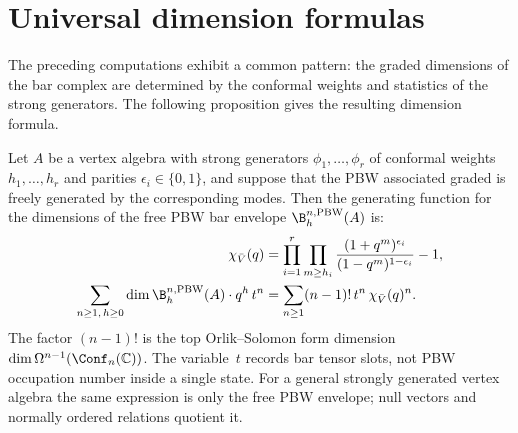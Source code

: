 \section{Universal dimension formulas}
\label{sec:universal-dim-formulas}

The preceding computations exhibit a common pattern: the graded
dimensions of the bar complex are determined by the
conformal weights and statistics of the strong generators.
The following proposition gives the resulting dimension formula.

\begin{proposition}
\label{prop:universal-dim-formula}
Let $A$ be a vertex algebra with strong generators
$\phi_1, \ldots, \phi_r$ of conformal weights $h_1, \ldots, h_r$
and parities $\epsilon_i \in \{0, 1\}$, and suppose that the PBW
associated graded is freely generated by the corresponding modes.
Then the generating function for the dimensions of the free PBW bar
envelope $\B^{n,\mathrm{PBW}}_h(A)$ is:
\begin{align}
\chi_{\bar V}(q)
&=
\prod_{i=1}^{r}
 \prod_{m \geq h_i}
 \frac{(1 + q^m)^{\epsilon_i}}{(1 - q^m)^{1-\epsilon_i}}
-1, \label{eq:universal-state-char}\\
\sum_{n \geq 1,\, h \geq 0} \dim \B^{n,\mathrm{PBW}}_h(A) \cdot q^h \, t^n
&=
\sum_{n\geq1} (n-1)!\,t^n\,\chi_{\bar V}(q)^n .
\label{eq:universal-dim}
\end{align}
The factor $(n-1)!$ is the top Orlik--Solomon form dimension
$\dim\Omega^{n-1}(\Conf_n(\mathbb C))$. The variable~$t$ records bar
tensor slots, not PBW occupation number inside a single state.
For a general strongly generated vertex algebra the same expression is
only the free PBW envelope; null vectors and normally ordered
relations quotient it.
\end{proposition}

